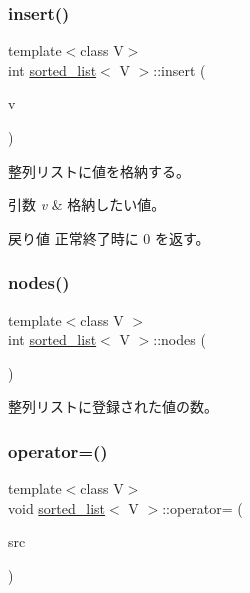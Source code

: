 \subsubsection{\texorpdfstring{insert()}{insert()}}
{\footnotesize\ttfamily template$<$class V$>$ \\
int \hyperlink{classsorted__list}{sorted\+\_\+list}$<$ V $>$\+::insert (\begin{DoxyParamCaption}\item[{V \&}]{v }\end{DoxyParamCaption})}

整列リストに値を格納する。 
\begin{DoxyParams}{引数}
{\em v} & 格納したい値。 \\
\hline
\end{DoxyParams}
\begin{DoxyReturn}{戻り値}
正常終了時に 0 を返す。 
\end{DoxyReturn}
\hypertarget{classsorted__list_a87bcb37ce7df9c4477eb1509601a8fea}{}\label{classsorted__list_a87bcb37ce7df9c4477eb1509601a8fea} 
\subsubsection{\texorpdfstring{nodes()}{nodes()}}
{\footnotesize\ttfamily template$<$class V $>$ \\
int \hyperlink{classsorted__list}{sorted\+\_\+list}$<$ V $>$\+::nodes (\begin{DoxyParamCaption}{ }\end{DoxyParamCaption})}

整列リストに登録された値の数。 \hypertarget{classsorted__list_a1cd2f040fc38f16be7dc5f92139f61d4}{}\label{classsorted__list_a1cd2f040fc38f16be7dc5f92139f61d4} 
\subsubsection{\texorpdfstring{operator=()}{operator=()}\hspace{0.1cm}{\footnotesize\ttfamily [1/2]}}
{\footnotesize\ttfamily template$<$class V$>$ \\
void \hyperlink{classsorted__list}{sorted\+\_\+list}$<$ V $>$\+::operator= (\begin{DoxyParamCaption}\item[{const \hyperlink{classsorted__list}{sorted\+\_\+list}$<$ V $>$ \&}]{src }\end{DoxyParamCaption})\hspace{0.3cm}{\ttfamily [delete]}}

